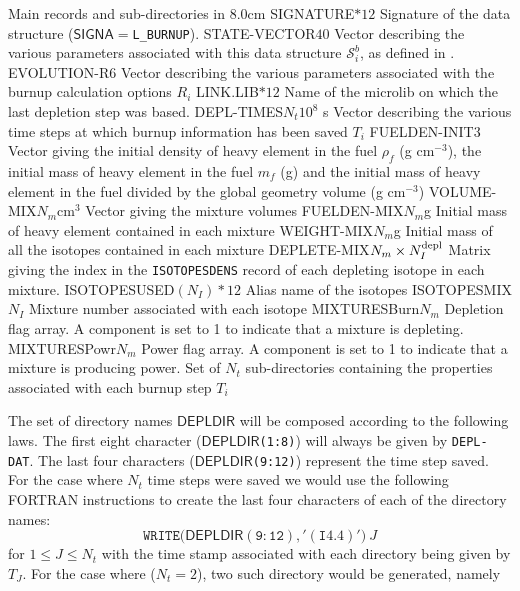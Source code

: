 \begin{DescriptionEnregistrement}{Main records and sub-directories in }{8.0cm}
\CharEnr
  {SIGNATURE}{$*12$}
  {Signature of the  data structure ($\mathsf{SIGNA}=${\tt L\_BURNUP}).}
\IntEnr
  {STATE-VECTOR}{$40$}
  {Vector describing the various parameters associated with this data structure
  $\mathcal{S}^{b}_{i}$, as defined in .}
\RealEnr
  {EVOLUTION-R}{$6$}{}
  {Vector describing the various parameters associated with the burnup calculation options
$R_{i}$}
\CharEnr
  {LINK.LIB}{$*12$}
  {Name of the {\sc microlib} on which the last depletion step was based.}
\RealEnr
  {DEPL-TIMES}{$N_{t}$}{$10^{8}$ s}
  {Vector describing the various time steps at which burnup information has been saved
$T_{i}$}
\RealEnr
  {FUELDEN-INIT}{$3$}{}
  {Vector giving the initial density of heavy element in the fuel $\rho_{f}$ (g
  cm$^{-3}$), the initial mass of heavy element in the fuel $m_{f}$ (g) and the
  initial mass of heavy element in the fuel divided by the global geometry
  volume (g cm$^{-3}$)}
\RealEnr
  {VOLUME-MIX}{$N_m$}{cm$^3$}
  {Vector giving the mixture volumes}
\RealEnr
  {FUELDEN-MIX}{$N_m$}{g}
  {Initial mass of heavy element contained in each mixture}
\RealEnr
  {WEIGHT-MIX}{$N_m$}{g}
  {Initial mass of all the isotopes contained in each mixture}
\IntEnr
  {DEPLETE-MIX}{$N_m \times N^{\rm depl}_{I}$}
  {Matrix giving the index in the {\tt ISOTOPESDENS} record of each depleting
   isotope in each mixture.}
\CharEnr
  {ISOTOPESUSED}{$(N_{I})*12$}
  {Alias name of the isotopes}
\IntEnr
  {ISOTOPESMIX}{$N_{I}$}
  {Mixture number associated with each isotope}
\IntEnr
  {MIXTURESBurn}{$N_m$}
  {Depletion flag array. A component is set to 1 to indicate that a mixture is depleting.}
\IntEnr
  {MIXTURESPowr}{$N_m$}
  {Power flag array. A component is set to 1 to indicate that a mixture is producing power.}
\DirVar
  {}
  {Set of $N_{t}$ sub-directories containing the properties associated with each
   burnup step $T_{i}$}
\end{DescriptionEnregistrement}

The set of directory  names $\mathsf{DEPLDIR}$ will be composed according to the
following laws. The first eight character ($\mathsf{DEPLDIR}$\verb*|(1:8)|) will always be given by 
\verb*|DEPL-DAT|. The last four characters  
($\mathsf{DEPLDIR}$\verb*|(9:12)|) represent the time step saved. For the case where
$N_{t}$ time steps were saved we would use the following FORTRAN instructions to create
the last four characters of each of the directory names:
$$
\mathtt{WRITE(}\mathsf{DEPLDIR}\mathtt{(9:12),'(I4.4)')}\: J
$$
for $1\leq J \leq N_{t}$ with the time stamp associated with each directory being given by
$T_{J}$.  For the case where ($N_{t}=2$), two such directory would be generated, namely

